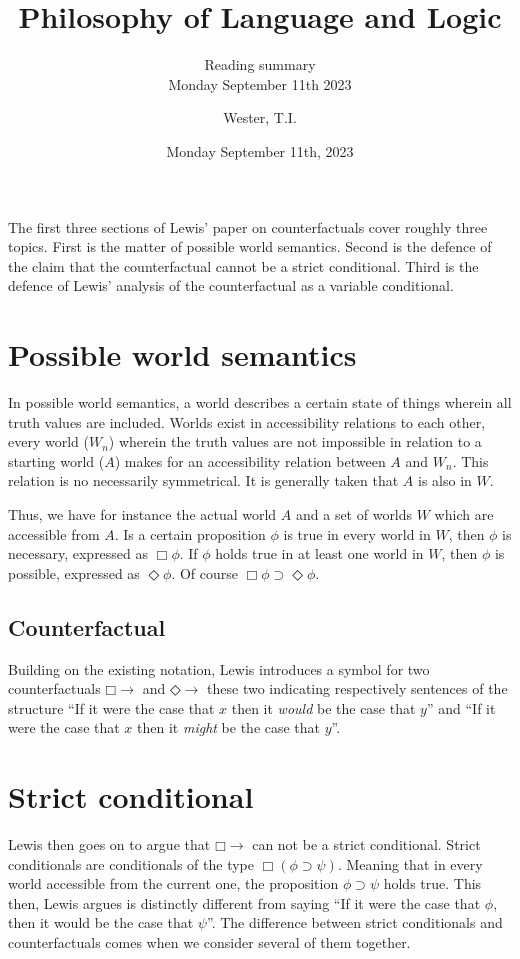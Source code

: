 \documentclass[12pt]{article}
\title{Philosophy of Language and Logic}
\subtitle{Reading summary\\Monday September 11th 2023}
\date{Monday September 11th, 2023}
\author{Wester, T.I.}
\newcommand{\would}{\mathbin{\Box}{\rightarrow}}
\newcommand{\might}{\mathbin{\Diamond}{\rightarrow}}
\begin{document}
\maketitle


The first three sections of Lewis' paper on counterfactuals cover roughly three
topics. First is the matter of possible world semantics. Second is the defence
of the claim that the counterfactual cannot be a strict conditional. Third is
the defence of Lewis' analysis of the counterfactual as a variable conditional.

\section{Possible world semantics}

In possible world semantics, a world describes a certain state of things wherein
all truth values are included. Worlds exist in accessibility relations to each
other, every world ($W_n$) wherein the truth values are not impossible in
relation to a starting world ($A$) makes for an accessibility relation between
$A$ and $W_n$. This relation is no necessarily symmetrical. It is generally
taken that $A$ is also in $W$.

Thus, we have for instance the actual world $A$ and a set of worlds $W$ which
are accessible from $A$. Is a certain proposition $\phi$ is true in every world
in $W$, then $\phi$ is necessary, expressed as $\Box \phi$. If $\phi$ holds
true in at least one world in $W$, then $\phi$ is possible, expressed as
$\Diamond \phi$. Of course $\Box \phi \supset \Diamond \phi$.

\subsection{Counterfactual}

Building on the existing notation, Lewis introduces a symbol for two
counterfactuals $\would$ and $\might$ these two indicating respectively sentences
of the structure ``If it were the case that $x$ then it \emph{would} be the case
that $y$'' and  ``If it were the case that $x$ then it \emph{might} be the case
that $y$''.

\section{Strict conditional}

Lewis then goes on to argue that $\would$ can not be a strict conditional.
Strict conditionals are conditionals of the type $\Box(\phi \supset \psi)$.
Meaning that in every world accessible from the current one, the proposition
$\phi \supset \psi$ holds true. This then, Lewis argues is distinctly different
from saying ``If it were the case that $\phi$, then it would be the case that
$\psi$''. The difference between strict conditionals and counterfactuals comes
when we consider several of them together.
\end{document}
